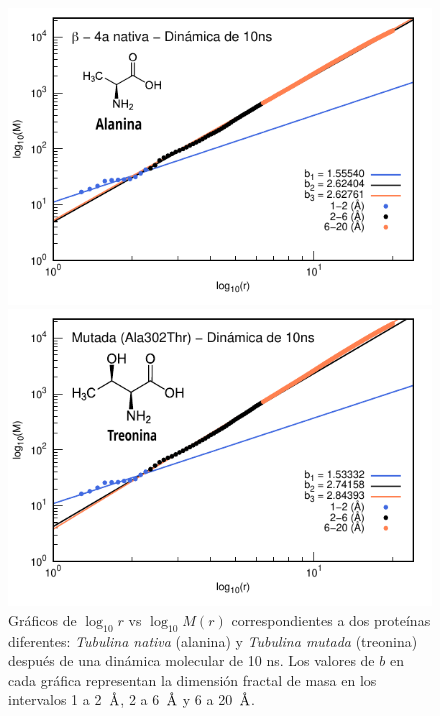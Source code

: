 	\begin{figure}[H]
		\hspace{-0.3cm} 
		\begin{minipage}{0.49\textwidth}
			\centering
			\includegraphics[width=\linewidth,page=1]{graphs/PDBs/Tubb4/TubNat10ns.pdf}
		\end{minipage}
		\hspace{0.2cm}
		\begin{minipage}{0.49\textwidth}
			\centering
			\includegraphics[width=\linewidth,page=1]{graphs/PDBs/Tubb4/TubMut10ns.pdf}
		\end{minipage}
		
		
		\caption{
			Gr\'{a}ficos de $\log_{10}r$ vs $\log_{10}M(r)$ correspondientes a dos prote\'{i}nas diferentes: \textit{Tubulina nativa} (alanina) y \textit{Tubulina mutada} (treonina) despu\'{e}s de una din\'{a}mica molecular de 10 ns. Los valores de $b$ en cada gr\'{a}fica representan la dimensi\'{o}n fractal de masa en los intervalos 1 a 2~$\textup{\r{A}}$, 2 a 6~$\textup{\r{A}}$ y 6 a 20~$\textup{\r{A}}$.}
		\label{fig:Tubs}
	\end{figure}
	
